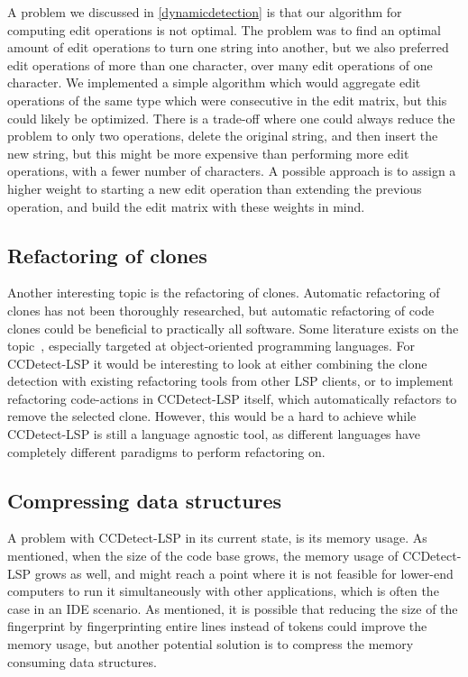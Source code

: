 A problem we discussed in \cref{dynamicdetection} is that our algorithm for computing edit
operations is not optimal. The problem was to find an optimal amount of edit operations to
turn one string into another, but we also preferred edit operations of more than one
character, over many edit operations of one character. We implemented a simple algorithm
which would aggregate edit operations of the same type which were consecutive in the edit
matrix, but this could likely be optimized. There is a trade-off where one could always
reduce the problem to only two operations, delete the original string, and then insert the
new string, but this might be more expensive than performing more edit operations, with a
fewer number of characters. A possible approach is to assign a higher weight to starting a
new edit operation than extending the previous operation, and build the edit matrix with
these weights in mind.

\subsection*{Refactoring of clones}

Another interesting topic is the refactoring of clones. Automatic refactoring of clones
has not been thoroughly researched, but automatic refactoring of code clones could be
beneficial to practically all software. Some literature exists on the
topic~\cite{TowardsAutomatedRefactoring, RefactoringOrientedClones}, especially targeted
at object-oriented programming languages. For CCDetect-LSP it would be interesting to look
at either combining the clone detection with existing refactoring tools from other LSP
clients, or to implement refactoring code-actions in CCDetect-LSP itself, which
automatically refactors to remove the selected clone. However, this would be a hard to
achieve while CCDetect-LSP is still a language agnostic tool, as different languages have
completely different paradigms to perform refactoring on.

\subsection*{Compressing data structures}

A problem with CCDetect-LSP in its current state, is its memory usage. As mentioned, when
the size of the code base grows, the memory usage of CCDetect-LSP grows as well, and might
reach a point where it is not feasible for lower-end computers to run it simultaneously
with other applications, which is often the case in an IDE scenario. As mentioned, it is
possible that reducing the size of the fingerprint by fingerprinting entire lines instead
of tokens could improve the memory usage, but another potential solution is to compress
the memory consuming data structures. 

